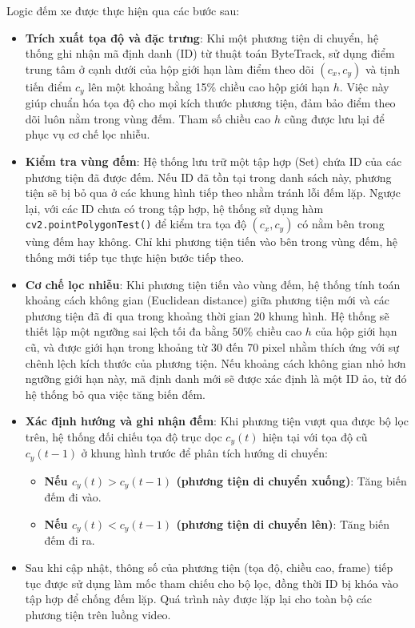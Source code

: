 Logic đếm xe được thực hiện qua các bước sau:
\begin{itemize}
	\item \textbf{Trích xuất tọa độ và đặc trưng}: Khi một phương tiện di chuyển, hệ thống ghi nhận mã định danh (ID) từ thuật toán ByteTrack, sử dụng điểm trung tâm ở cạnh dưới của hộp giới hạn làm điểm theo dõi $(c_x, c_y)$ và tịnh tiến điểm $c_y$ lên một khoảng bằng 15\% chiều cao hộp giới hạn $h$. Việc này giúp chuẩn hóa tọa độ cho mọi kích thước phương tiện, đảm bảo điểm theo dõi luôn nằm trong vùng đếm. Tham số chiều cao $h$ cũng được lưu lại để phục vụ cơ chế lọc nhiễu.
	
	\item \textbf{Kiểm tra vùng đếm}: Hệ thống lưu trữ một tập hợp (Set) chứa ID của các phương tiện đã được đếm. Nếu ID đã tồn tại trong danh sách này, phương tiện sẽ bị bỏ qua ở các khung hình tiếp theo nhằm tránh lỗi đếm lặp. Ngược lại, với các ID chưa có trong tập hợp, hệ thống sử dụng hàm \texttt{cv2.pointPolygonTest()} để kiểm tra tọa độ $(c_x, c_y)$ có nằm bên trong vùng đếm hay không. Chỉ khi phương tiện tiến vào bên trong vùng đếm, hệ thống mới tiếp tục thực hiện bước tiếp theo.
	
	\item \textbf{Cơ chế lọc nhiễu}: Khi phương tiện tiến vào vùng đếm, hệ thống tính toán khoảng cách không gian (Euclidean distance) giữa phương tiện mới và các phương tiện đã đi qua trong khoảng thời gian 20 khung hình. Hệ thống sẽ thiết lập một ngưỡng sai lệch tối đa bằng 50\% chiều cao $h$ của hộp giới hạn cũ, và được giới hạn trong khoảng từ 30 đến 70 pixel nhằm thích ứng với sự chênh lệch kích thước của phương tiện. Nếu khoảng cách không gian nhỏ hơn ngưỡng giới hạn này, mã định danh mới sẽ được xác định là một ID ảo, từ đó hệ thống bỏ qua việc tăng biến đếm.
	
	\item \textbf{Xác định hướng và ghi nhận đếm}: Khi phương tiện vượt qua được bộ lọc trên, hệ thống đối chiếu tọa độ trục dọc $c_y(t)$ hiện tại với tọa độ cũ $c_y(t-1)$ ở khung hình trước để phân tích hướng di chuyển:
	\begin{itemize}
		\item[$\circ$] \textbf{Nếu $c_y(t) > c_y(t-1)$ (phương tiện di chuyển xuống)}: Tăng biến đếm đi vào.
		
		\item[$\circ$] \textbf{Nếu $c_y(t) < c_y(t-1)$ (phương tiện di chuyển lên)}: Tăng biến đếm đi ra.
	\end{itemize}

\item Sau khi cập nhật, thông số của phương tiện (tọa độ, chiều cao, frame) tiếp tục được sử dụng làm mốc tham chiếu cho bộ lọc, đồng thời ID bị khóa vào tập hợp để chống đếm lặp. Quá trình này được lặp lại cho toàn bộ các phương tiện trên luồng video.
\end{itemize}